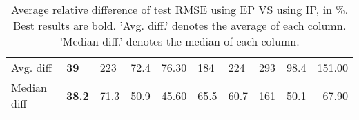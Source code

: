 \begin{table}[ht!]
\begin{tabular}{llllrllllr}
   \hline
Avg. diff & \textbf{39} & 223 & 72.4 & 76.30 & 184 & 224 & 293 & 98.4 & 151.00 \\ 
  Median diff & \textbf{38.2} & 71.3 & 50.9 & 45.60 & 65.5 & 60.7 & 161 & 50.1 & 67.90 \\ 
   \hline
\hline
\end{tabular}
\endgroup
\caption{Average relative difference of test RMSE using EP VS using IP, in \%. 
                  Best results are bold. 
                  'Avg. diff.' denotes the average of each column.
                  'Median diff.' denotes the median of each column.} 
\label{TABLES/table_results_RMSE_mahalanobis_only_num_features_EP_VS_IP}
\end{table}
